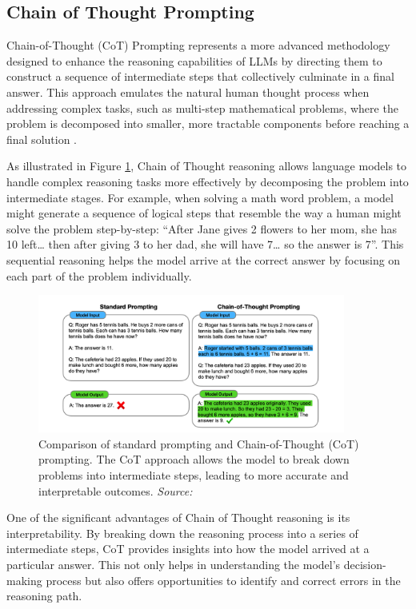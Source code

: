 \subsection{Chain of Thought Prompting}

Chain-of-Thought (CoT) Prompting represents a more advanced methodology designed to enhance the reasoning capabilities of LLMs by directing them to construct a sequence of intermediate steps that collectively culminate in a final answer. This approach emulates the natural human thought process when addressing complex tasks, such as multi-step mathematical problems, where the problem is decomposed into smaller, more tractable components before reaching a final solution \cite{wei2022chain}.

As illustrated in Figure \ref{fig:cot_reasoning}, Chain of Thought reasoning allows language models to handle complex reasoning tasks more effectively by decomposing the problem into intermediate stages. For example, when solving a math word problem, a model might generate a sequence of logical steps that resemble the way a human might solve the problem step-by-step: “After Jane gives 2 flowers to her mom, she has 10 left… then after giving 3 to her dad, she will have 7… so the answer is 7”. This sequential reasoning helps the model arrive at the correct answer by focusing on each part of the problem individually.

\begin{figure}[h]
    \centering
    \includegraphics[width=0.9\textwidth]{images/llms/cot-resoning.png}
    \caption{Comparison of standard prompting and Chain-of-Thought (CoT) prompting. The CoT approach allows the model to break down problems into intermediate steps, leading to more accurate and interpretable outcomes. \textit{Source:} \cite{wei2022chain}}
    \label{fig:cot_reasoning}
\end{figure}

One of the significant advantages of Chain of Thought reasoning is its interpretability. By breaking down the reasoning process into a series of intermediate steps, CoT provides insights into how the model arrived at a particular answer. This not only helps in understanding the model’s decision-making process but also offers opportunities to identify and correct errors in the reasoning path.

